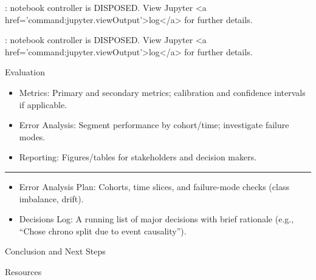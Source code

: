 \documentclass[
  letterpaper,
  DIV=11,
  numbers=noendperiod]{scrartcl}
\providecommand{\tightlist}{%
  \setlength{\itemsep}{0pt}\setlength{\parskip}{0pt}}
\begin{document}
\begin{Highlighting}
\textcolor{black}{: }
\textcolor{black}{}\textcolor{QuartoInternalColor1}{notebook controller is DISPOSED. }
\textcolor{QuartoInternalColor1}{}\textcolor{QuartoInternalColor1}{View Jupyter <a href='command:jupyter.viewOutput'>log</a> for further details.}
\end{Highlighting}

\begin{Highlighting}
\textcolor{black}{: }
\textcolor{black}{}\textcolor{QuartoInternalColor1}{notebook controller is DISPOSED. }
\textcolor{QuartoInternalColor1}{}\textcolor{QuartoInternalColor1}{View Jupyter <a href='command:jupyter.viewOutput'>log</a> for further details.}
\end{Highlighting}

Evaluation

\begin{itemize}
\tightlist
\item
  Metrics: Primary and secondary metrics; calibration and confidence
  intervals if applicable.
\item
  Error Analysis: Segment performance by cohort/time; investigate
  failure modes.
\item
  Reporting: Figures/tables for stakeholders and decision makers.
\end{itemize}

\begin{center}\rule{0.5\linewidth}{0.5pt}\end{center}

\begin{itemize}
\tightlist
\item
  Error Analysis Plan: Cohorts, time slices, and failure-mode checks
  (class imbalance, drift).
\item
  Decisions Log: A running list of major decisions with brief rationale
  (e.g., ``Chose chrono split due to event causality'').
\end{itemize}

Conclusion and Next Steps

Resources
\end{document}
